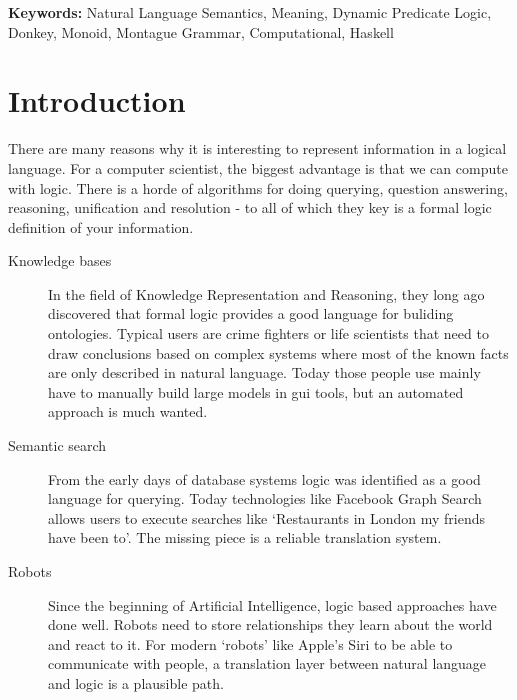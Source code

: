 \documentclass[12pt]{article}
\let\stdsection\section
\renewcommand\section{\newpage\stdsection}
\begin{document}
\smallskip\smallskip
\noindent \small{\textbf{Keywords:} Natural Language Semantics, Meaning, Dynamic Predicate Logic, Donkey, Monoid, Montague Grammar, Computational, Haskell}

\tableofcontents


\section{Introduction}



There are many reasons why it is interesting to represent information in a logical language. For a computer scientist, the biggest advantage is that we can compute with logic. There is a horde of algorithms for doing querying, question answering, reasoning, unification and resolution - to all of which they key is a formal logic definition of your information.

\begin{description}
\item[Knowledge bases] In the field of Knowledge Representation and Reasoning, they long ago discovered that formal logic provides a good language for buliding ontologies. Typical users are crime fighters or life scientists that need to draw conclusions based on complex systems\cite{malone2010modeling} where most of the known facts are only described in natural language. Today those people use mainly have to manually build large models in gui tools, but an automated approach is much wanted.

\item[Semantic search] From the early days of database systems logic was identified\cite{fagin1995reasoning} as a good language for querying. Today technologies like Facebook Graph Search allows users to execute searches like `Restaurants in London my friends have been to'. The missing piece is a reliable translation system.

\item[Robots] Since the beginning of Artificial Intelligence, logic based approaches have done well.\cite{russell2010artificial} Robots need to store relationships they learn about the world and react to it. For modern `robots' like Apple's Siri to be able to communicate with people, a translation layer between natural language and logic is a plausible path.
\end{description}
\end{document}
